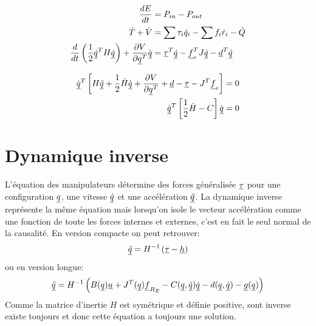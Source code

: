 \begin{align}
\frac{dE}{dt}     &= P_{in} - P_{out} \\
\dot{T} + \dot{V}  &= \sum \tau_i \dot{q}_i  - \sum f_i \dot{r}_i - \dot{Q} \\
\frac{d}{dt}\left( \frac{1}{2} \underline{\dot{q}}^T H \underline{\dot{q}} \right) + \frac{\partial V}{\partial \underline{q}^T} \dot{\underline{q}} &= \underline{\tau}^T \underline{\dot{q}}  - \underline{f}_e^T J \underline{\dot{q}} - \underline{d}^T \underline{\dot{q}}
\end{align}

\begin{align}
\dot{\underline{q}}^T \left[ H \underline{\ddot{q}} + \frac{1}{2}\dot{H}\dot{\underline{q}} + \frac{\partial V}{\partial \underline{q}^T} + \underline{d} - \underline{\tau} - J^T \underline{f}_e  \right] &= 0 \\
\dot{\underline{q}}^T \left[ \frac{1}{2}\dot{H} - C \right] \dot{\underline{q}} &= 0
\end{align}


\section{Dynamique inverse}
\label{sec:inversedynamic}

L'équation des manipulateurs détermine des forces généralisée $\underline{\tau}$ pour une configuration $\underline{q}$, une vitesse $\underline{\dot{q}}$ et une accélération $\underline{\ddot{q}}$. La dynamique inverse représente la même équation mais lorsqu'on isole le vecteur accélération comme une fonction de toute les forces internes et externes, c'est en fait le seul normal de la causalité. En version compacte on peut retrouver:
\begin{align}
\underline{\ddot{q}}  = H^{-1} \left( \underline{\tau} - \underline{h} \right)
\end{align}
ou en version longue:
\begin{align}
\underline{\ddot{q}}  = H^{-1} \left( B(\underline{q}) \underline{u}  + J^T(\underline{q}) \underline{f}_{R_E} - C(\underline{q},\underline{\dot{q}}) \underline{\dot{q}} - d(\underline{q}, \underline{\dot{q}}) - \underline{g}(\underline{q})  \right)
\end{align}
Comme la matrice d'inertie $H$ est symétrique et définie positive, sont inverse existe toujours et donc cette équation a toujours une solution.

